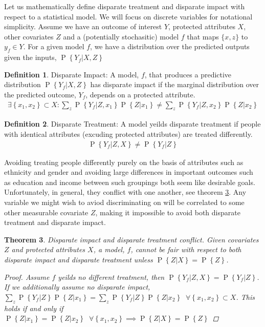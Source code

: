 \documentclass[11pt,a4paper,oneside]{book}
\newcommand{\set}[1]{\left\{#1\right\}}
\newcommand{\eqn}[1]{\begin{align}#1\end{align}}
\renewcommand{\P}[1]{\operatorname{P}\left\{#1\right\}}
\theoremstyle{plain}
\newtheorem{theorem}{Theorem}
\theoremstyle{definition}
\newtheorem{definition}[theorem]{Definition}
\begin{document}
Let us mathematically define disparate treatment and disparate impact with respect to a statistical model. We will focus on discrete variables for notational simplicity. Assume we have an outcome of interest $Y$, protected attributes $X$, other covariates $Z$ and a (potentially stochasitic) model $f$ that maps $\{x, z\}$ to $y_f \in Y$. For a given model $f$, we have a distribution over the predicted outputs given the inputs, $\P{Y_f|X,Z}$
\vspace{.2cm}
\begin{definition}{Disparate Impact}: A model, $f$, that produces a predictive distribution $\P{Y_f|X,Z}$ has disparate impact if the marginal distribution over the predicted outcome, $Y_f$, depends on a protected attribute.
\eqn{
\exists \set{x_1,x_2} \subset X: \sum_z{\P{Y_f|Z,x_1}\P{Z|x_1}} \neq \sum_z{\P{Y_f|Z,x_2}\P{Z|x_2}}
}
\end{definition}

\begin{definition}{Disparate Treatment}: A model yeilds disparate treatment if people with identical attributes (excuding protected attributes) are treated differently. 
\eqn{
\P{Y_f|Z,X} \neq \P{Y_f|Z}
}
\end{definition}

Avoiding treating people differently purely on the basis of attributes such as ethnicity and gender and avoiding large differences in important outcomes such as education and income between such groupings both seem like desirable goals. Unfortunately, in general, they conflict with one another, see theorem \ref{thm:disparate_conflict}. Any variable we might wish to aviod discriminating on will be correlated to some other measurable covariate $Z$, making it impossible to avoid both disparate treatment and disparate impact. 
\vspace{.2cm}
\begin{theorem} 
\label{thm:disparate_conflict}
Disparate impact and disparate treatment conflict. Given covariates $Z$ and protected attributes $X$, a model, $f$, cannot be fair with respect to both disparate impact and disparate treatment unless $\P{Z|X} = \P{Z}$.
\begin{proof} Assume $f$ yeilds no different treatment, then $\P{Y_f|Z,X} = \P{Y_f|Z}$. If we additionally assume no disparate impact, $\sum_z{\P{Y_f|Z}\P{Z|x_1}} = \sum_z{\P{Y_f|Z}\P{Z|x_2}} \;\; \forall \set{x_1,x_2}\subset X$. This holds if and only if $\P{Z|x_1} = \P{Z|x_2} \;\; \forall \set{x_1,x_2} \implies \P{Z|X} = \P{Z}$
\end{proof} 
\end{theorem}  
\end{document}
